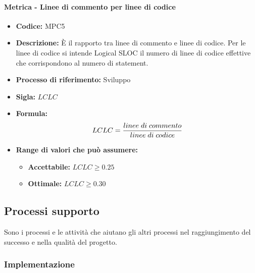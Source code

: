     \paragraph{Metrica - Linee di commento per linee di codice}
    \begin{itemize}
        \item \textbf{Codice:} MPC5
        \item \textbf{Descrizione:} È il rapporto tra linee di commento e linee di codice. Per le linee di codice si intende Logical SLOC il numero di linee di codice effettive che corrispondono al numero di statement.
        \item \textbf{Processo di riferimento:} Sviluppo
        \item \textbf{Sigla:} $LCLC$
        \item \textbf{Formula:}$$LCLC = {linee \; di \; commento\over linee \; di \; codice}$$
        \item \textbf{Range di valori che può assumere:}
        \begin{itemize}
            \item \textbf{Accettabile:} $LCLC \geq 0.25$
            \item \textbf{Ottimale:} $LCLC \geq 0.30$
        \end{itemize}
    \end{itemize}

\subsection{Processi supporto}
Sono i processi e le attività che aiutano gli altri processi nel raggiungimento del successo e nella qualità del progetto.
  
\subsubsection{Implementazione}
